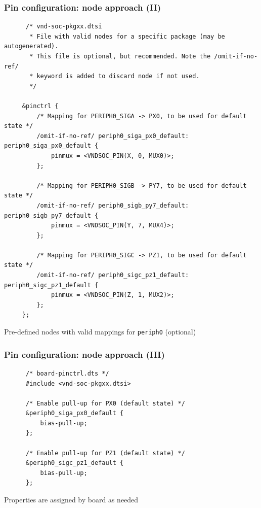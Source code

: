 \documentclass[handout]{beamer}
\begin{document}
\begin{frame}[fragile]
  \frametitle{Pin configuration: node approach (II)}

  \begin{listing}[H]
    \begin{verbatim}
      /* vnd-soc-pkgxx.dtsi
       * File with valid nodes for a specific package (may be autogenerated).
       * This file is optional, but recommended. Note the /omit-if-no-ref/
       * keyword is added to discard node if not used.
       */
 
     &pinctrl {
         /* Mapping for PERIPH0_SIGA -> PX0, to be used for default state */
         /omit-if-no-ref/ periph0_siga_px0_default: periph0_siga_px0_default {
             pinmux = <VNDSOC_PIN(X, 0, MUX0)>;
         };
 
         /* Mapping for PERIPH0_SIGB -> PY7, to be used for default state */
         /omit-if-no-ref/ periph0_sigb_py7_default: periph0_sigb_py7_default {
             pinmux = <VNDSOC_PIN(Y, 7, MUX4)>;
         };
 
         /* Mapping for PERIPH0_SIGC -> PZ1, to be used for default state */
         /omit-if-no-ref/ periph0_sigc_pz1_default: periph0_sigc_pz1_default {
             pinmux = <VNDSOC_PIN(Z, 1, MUX2)>;
         };
     };
    \end{verbatim}
    \caption{Pre-defined nodes with valid mappings for \texttt{periph0}
      (optional)}
  \end{listing}
\end{frame}

\begin{frame}[fragile]
  \frametitle{Pin configuration: node approach (III)}

  \begin{listing}[H]
    \begin{verbatim}
      /* board-pinctrl.dts */
      #include <vnd-soc-pkgxx.dtsi>

      /* Enable pull-up for PX0 (default state) */
      &periph0_siga_px0_default {
          bias-pull-up;
      };

      /* Enable pull-up for PZ1 (default state) */
      &periph0_sigc_pz1_default {
          bias-pull-up;
      };
    \end{verbatim}
    \caption{Properties are assigned by board as needed}
  \end{listing}
\end{frame}
\end{document}
